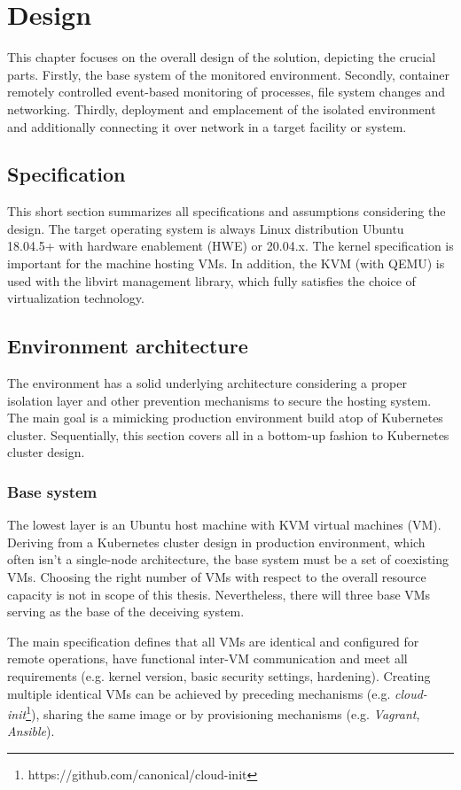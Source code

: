 \chapter{Design \label{design}}
This chapter focuses on the overall design of the solution, depicting the crucial parts. Firstly, the base system of the monitored environment. Secondly, container remotely controlled event-based monitoring of processes, file system changes and networking. Thirdly, deployment and emplacement of the isolated environment and additionally connecting it over network in a target facility or system.

\section{Specification \label{design:specs}}
This short section summarizes all specifications and assumptions considering the design. The target operating system is always Linux distribution Ubuntu 18.04.5+ with hardware enablement (HWE) or 20.04.x. The kernel specification is important for the machine hosting VMs. In addition, the KVM (with QEMU) is used with the libvirt management library, which fully satisfies the choice of virtualization technology.

\section{Environment architecture \label{design:env-arch}}
The environment has a solid underlying architecture considering a proper isolation layer and other prevention mechanisms to secure the hosting system. The main goal is a mimicking production environment build atop of Kubernetes cluster. Sequentially, this section covers all in a bottom-up fashion to Kubernetes cluster design.

\subsection{Base system \label{design:env-arch:base}}
The lowest layer is an Ubuntu host machine with KVM virtual machines (VM). Deriving from a Kubernetes cluster design in production environment, which often isn't a single-node architecture, the base system must be a set of coexisting VMs. Choosing the right number of VMs with respect to the overall resource capacity is not in scope of this thesis. Nevertheless, there will three base VMs serving as the base of the deceiving system.

The main specification defines that all VMs are identical and configured for remote operations, have functional inter-VM communication and meet all requirements (e.g. kernel version, basic security settings, hardening). Creating multiple identical VMs can be achieved by preceding mechanisms (e.g. \textit{cloud-init}\footnote{https://github.com/canonical/cloud-init}), sharing the same image or by provisioning mechanisms (e.g. \textit{Vagrant}, \textit{Ansible}).

